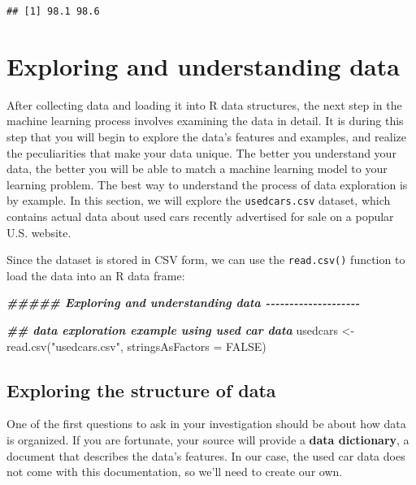 \documentclass[
]{article}
\newenvironment{Shaded}{\begin{snugshade}}{\end{snugshade}}
\newcommand{\AttributeTok}[1]{\textcolor[rgb]{0.77,0.63,0.00}{#1}}
\newcommand{\ConstantTok}[1]{\textcolor[rgb]{0.00,0.00,0.00}{#1}}
\newcommand{\DocumentationTok}[1]{\textcolor[rgb]{0.56,0.35,0.01}{\textbf{\textit{#1}}}}
\newcommand{\FunctionTok}[1]{\textcolor[rgb]{0.00,0.00,0.00}{#1}}
\newcommand{\NormalTok}[1]{#1}
\newcommand{\OtherTok}[1]{\textcolor[rgb]{0.56,0.35,0.01}{#1}}
\newcommand{\StringTok}[1]{\textcolor[rgb]{0.31,0.60,0.02}{#1}}
\begin{document}
\begin{verbatim}
## [1] 98.1 98.6
\end{verbatim}

\hypertarget{exploring-and-understanding-data}{%
\section{Exploring and understanding
data}\label{exploring-and-understanding-data}}

After collecting data and loading it into R data structures, the next
step in the machine learning process involves examining the data in
detail. It is during this step that you will begin to explore the data's
features and examples, and realize the peculiarities that make your data
unique. The better you understand your data, the better you will be able
to match a machine learning model to your learning problem. The best way
to understand the process of data exploration is by example. In this
section, we will explore the \texttt{usedcars.csv} dataset, which
contains actual data about used cars recently advertised for sale on a
popular U.S. website.

Since the dataset is stored in CSV form, we can use the
\texttt{read.csv()} function to load the data into an R data frame:

\begin{Shaded}
\begin{Highlighting}[]
\DocumentationTok{\#\#\#\#\# Exploring and understanding data {-}{-}{-}{-}{-}{-}{-}{-}{-}{-}{-}{-}{-}{-}{-}{-}{-}{-}{-}{-}}

\DocumentationTok{\#\# data exploration example using used car data}
\NormalTok{usedcars }\OtherTok{\textless{}{-}} \FunctionTok{read.csv}\NormalTok{(}\StringTok{"usedcars.csv"}\NormalTok{, }\AttributeTok{stringsAsFactors =} \ConstantTok{FALSE}\NormalTok{)}
\end{Highlighting}
\end{Shaded}

\hypertarget{exploring-the-structure-of-data}{%
\subsection{Exploring the structure of
data}\label{exploring-the-structure-of-data}}

One of the first questions to ask in your investigation should be about
how data is organized. If you are fortunate, your source will provide a
\textbf{data dictionary}, a document that describes the data's features.
In our case, the used car data does not come with this documentation, so
we'll need to create our own.
\end{document}
